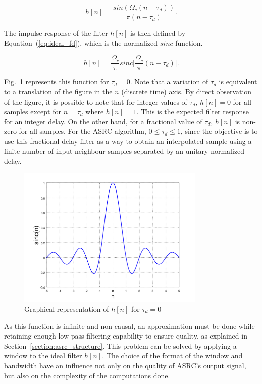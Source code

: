\begin{equation}
  h[n] = \frac{sin(\Omega_c (n-\tau_{d}))}{\pi (n-\tau_{d})}.
  \label{eq:h_sine}
\end{equation}

The impulse response of the filter $h[n]$ is then defined by Equation~(\ref{eq:ideal_fd}),
which is the normalized $sinc$ function.

\begin{equation}
  h[n] = \frac{\Omega_c}{\pi}sinc\bigg[\frac{\Omega_c}{\pi}(n - \tau_d)\bigg].
  \label{eq:ideal_fd}
\end{equation}

Fig.~\ref{fig:sinc} represents this function for $\tau_{d} = 0$. Note that a
variation of $\tau_{d}$ is equivalent to a translation of the figure in the $n$
(discrete time) axis. By direct observation of the figure, it is possible to
note that for integer values of $\tau_{d}$, $h[n] = 0$ for all samples except
for $n = \tau_{d}$ where $h[n] = 1$. This is the expected filter response for an
integer delay. On the other hand, for a fractional value of $\tau_{d}$, $h[n]$
is non-zero for all samples. For the ASRC algorithm, $0 \leq \tau_{d} \leq 1$,
since the objective is to use this fractional delay filter as a way to obtain an
interpolated sample using a finite number of input neighbour samples separated
by an unitary normalized delay.


\begin{figure}[!htb]
  \centering
  \includegraphics[width=0.8\textwidth]{Figures/sinc.png}
  \caption{Graphical representation of $h[n]$ for $\tau_{d} = 0$}
  \label{fig:sinc}
\end{figure}
  
As this function is infinite and non-causal, an approximation must be done while
retaining enough low-pass filtering capability to ensure quality, as explained
in Section~\ref{section:asrc_structure}. This
problem can be solved by applying a window to the ideal filter $h[n]$. The
choice of the format of the window and bandwidth have an influence not only on
the quality of ASRC's output signal, but also on the complexity of the
computations done.


